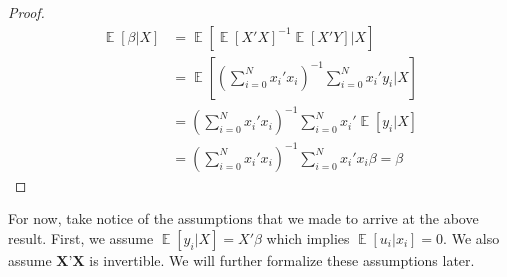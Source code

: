 \documentclass[dvips,11pt]{article}
\DeclareMathOperator{\?}{\,?\,}
\DeclareMathOperator{\E}{\mathbb{E}}
\newenvironment{remark}[1][Remark]{\begin{trivlist}
\item[\hskip \labelsep {\bfseries #1.}]}{\end{trivlist}}
\begin{document}
\begin{proof} 
$$
\begin{aligned}
\E [\beta|X] &= \E[\E[X'X]^{-1}\E[X'Y]|X] \\
& = \E[(\sum^N_{i=0}x_i'x_i)^{-1}\sum^N_{i=0}x_i'y_i | X] \\
& = (\sum^N_{i=0}x_i'x_i)^{-1}\sum^N_{i=0}x_i'\E[y_i|X] \\
& = (\sum^N_{i=0}x_i'x_i)^{-1}\sum^N_{i=0}x_i'x_i\beta = \beta
\end{aligned}
$$
\end{proof}
\begin{remark}For now, take notice of the assumptions that we made to arrive at the above result. First, we assume $\E[y_i|X]=X'\beta$ which implies $\E[u_i|x_i] = 0$. We also assume $\textbf{X'X}$ is invertible. We will further formalize these assumptions later.\end{remark}
\pagebreak
\end{document}
